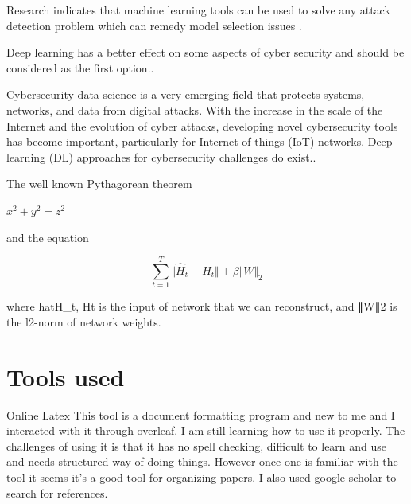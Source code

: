 \documentclass{article}
\begin{document}
Research indicates that machine learning tools can be used to solve any attack detection problem which can remedy model selection issues \cite{berghout2022machine}.

Deep learning has a better effect on some aspects of cyber security and should be considered as the first option.\cite{li2021deep}.

Cybersecurity data science is a very emerging field that protects systems, networks, and data from digital attacks. With the increase in the scale of the Internet and the evolution of cyber attacks, developing novel cybersecurity tools has become important, particularly for Internet of things (IoT) networks. Deep learning (DL) approaches for cybersecurity challenges do exist.\cite{podder2021artificial}.
\par
 \doublespacing
The well known Pythagorean theorem \par \(x^2 + y^2 = z^2\) \par and the equation \par
 \doublespacing
\begin{equation*} \sum _{t=1}^{T}\Vert {\hat{H}_t-H_t}\Vert +\beta \Vert W\Vert _2 \tag{11} \end{equation*}

where hat{H}_t, Ht  is the input of network that we can reconstruct, and ∥W∥2 is the l2-norm of network weights.

\nocite{jain2004introduction}
\nocite{yu2003ga}
\nocite{roy2018protection}
\nocite{zhang2021research}
\nocite{lecun2015deep}
\nocite{bai2021know}
\nocite{yu2021information}
\nocite{xu2018industry}
\nocite{culot2019addressing}
\nocite{meneghello2019iot}
\nocite{wang2019blockchain}
\nocite{falco2018iiot}
\nocite{pan2015classification}
\nocite{zhang2003data}
\nocite{demertzis2018next}
\nocite{hao2016mining}
\nocite{zhao2019blockchain}
\nocite{gurdgiev2021informational}
\nocite{jain2004introduction}
\nocite{podder2021artificial}

\medskip

\section{Tools used}
Online Latex
This tool is a document formatting program and new to me and I interacted with it through overleaf. I am still learning how to use it properly. The challenges of using it is that it has no spell checking, difficult to learn and use and  needs structured way of doing things. However once one is familiar with the tool it seems it's a good tool for organizing papers. I also used google scholar to search for references. 

\printbibliography
\end{document}
